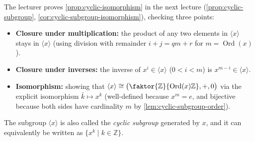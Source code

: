 \begin{content}

\begin{steps}
The lecturer proves \cref{prop:cyclic-isomorphism} in the next lecture (\cref{prop:cyclic-subgroup}, \cref{cor:cyclic-subgroup-isomorphism}), checking three points:
\begin{itemize}
    \item \textbf{Closure under multiplication:} the product of any two elements in $\langle x \rangle$ stays in $\langle x \rangle$ (using division with remainder $i + j = qm + r$ for $m = \operatorname{Ord}(x)$).
    \item \textbf{Closure under inverses:} the inverse of $x^i \in \langle x \rangle$ ($0 < i < m$) is $x^{m-i} \in \langle x \rangle$.
    \item \textbf{Isomorphism:} showing that $\langle x \rangle \cong \bigl(\faktor{\mathbb{Z}}{\operatorname{Ord}(x)\mathbb{Z}}, +, 0\bigr)$ via the explicit isomorphism $\bar{k} \mapsto x^k$ (well-defined because $x^m = e$, and bijective because both sides have cardinality $m$ by \cref{lem:cyclic-subgroup-order}).
\end{itemize}
\end{steps}
\end{content}

\begin{aiNote}
The subgroup $\langle x \rangle$ is also called the \emph{cyclic subgroup} generated by $x$, and it can equivalently be written as $\{ x^k \mid k \in \mathbb{Z} \}$.
\end{aiNote}

